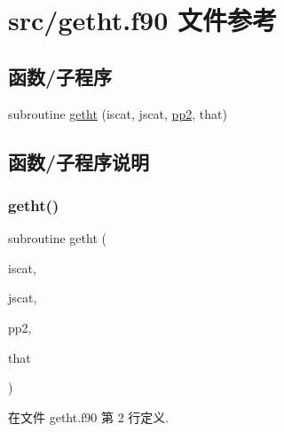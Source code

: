 \hypertarget{getht_8f90}{}\section{src/getht.f90 文件参考}
\label{getht_8f90}
\subsection*{函数/子程序}
\begin{DoxyCompactItemize}
\item 
subroutine \mbox{\hyperlink{getht_8f90_aacbc4237ed2a07ef381dd960cbd85224}{getht}} (iscat, jscat, \mbox{\hyperlink{pp2_8f90_abd04c01efbaa454577eac785f7a4889b}{pp2}}, that)
\end{DoxyCompactItemize}


\subsection{函数/子程序说明}
\mbox{\label{getht_8f90_aacbc4237ed2a07ef381dd960cbd85224}} 
\subsubsection{\texorpdfstring{getht()}{getht()}}
{\footnotesize\ttfamily subroutine getht (\begin{DoxyParamCaption}\item[{}]{iscat,  }\item[{}]{jscat,  }\item[{}]{pp2,  }\item[{}]{that }\end{DoxyParamCaption})}



在文件 getht.\+f90 第 2 行定义.

